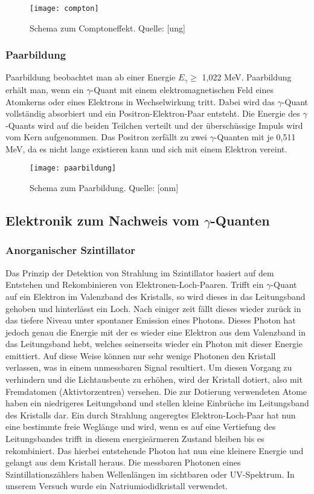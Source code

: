 \begin{figure}[h]
\begin{center}
\texttt{[image: compton]}
\caption{Schema zum Comptoneffekt. Quelle: [ung]}
\label{fig:compton}
\end{center}
\end{figure}

\subsubsection{Paarbildung}
Paarbildung beobachtet man ab einer Energie $E_{\gamma} \ge$ 1,022 MeV. Paarbildung erhält man, wenn ein $\gamma$-Quant mit einem elektromagnetischen Feld eines Atomkerns oder eines Elektrons in Wechselwirkung tritt. Dabei wird das $\gamma$-Quant vollständig absorbiert und ein Positron-Elektron-Paar entsteht. Die Energie des $\gamma$-Quants wird auf die beiden Teilchen verteilt und der überschüssige Impuls wird vom Kern aufgenommen. Das Positron zerfällt zu zwei $\gamma$-Quanten mit je 0,511 MeV, da es nicht lange existieren kann und sich mit einem Elektron vereint.
\begin{figure}[h]
\begin{center}
\texttt{[image: paarbildung]}
\caption{Schema zum Paarbildung. Quelle: [onm]}
\label{fig:graph1}
\end{center}
\end{figure}
\subsection{Elektronik zum Nachweis vom $\gamma$-Quanten}
\subsubsection{Anorganischer Szintillator}
Das Prinzip der Detektion von Strahlung im Szintillator basiert auf dem Entstehen und Rekombinieren von Elektronen-Loch-Paaren. Trifft ein $\gamma$-Quant auf ein Elektron im Valenzband des Kristalls, so wird dieses in das Leitungsband gehoben und hinterlässt ein Loch. Nach einiger zeit fällt dieses wieder zurück in das tiefere Niveau unter spontaner Emission eines Photons. Dieses Photon hat jedoch genau die Energie mit der es wieder eine Elektron aus dem Valenzband in das Leitungsband hebt, welches seinerseits wieder ein Photon mit dieser Energie emittiert. Auf diese Weise können nur sehr wenige Photonen den Kristall verlassen, was in einem unmessbaren Signal resultiert. Um diesen Vorgang zu verhindern und die Lichtausbeute zu erhöhen, wird der Kristall dotiert, also mit Fremdatomen (Aktivtorzentren) versehen. Die zur Dotierung verwendeten Atome haben ein niedrigeres Leitungsband und stellen kleine Einbrüche im Leitungsband des Kristalls dar. Ein durch Strahlung angeregtes Elektron-Loch-Paar hat nun eine bestimmte freie Weglänge und wird, wenn es auf eine Vertiefung des Leitungsbandes trifft in diesem energieärmeren Zustand bleiben bis es rekombiniert. Das hierbei entstehende Photon hat nun eine kleinere Energie und gelangt aus dem Kristall heraus. Die messbaren Photonen eines Szintillationszählers haben Wellenlängen im sichtbaren oder UV-Spektrum. In unserem Versuch wurde ein Natriumiodidkristall verwendet.

